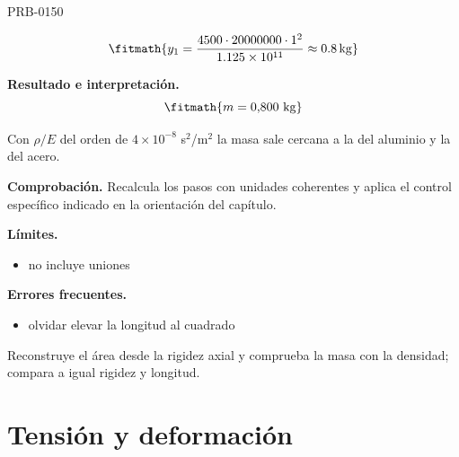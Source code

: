 \begin{studiumworked}{PRB-0150}
\begin{enumerate}
\[\fitmath{y_{1}=\frac{4500\cdot 20000000\cdot {1}^{2}}{1.125\times10^{11}}\approx 0.8\,\mathrm{kg}}\]

\end{enumerate}

\textbf{Resultado e interpretación.}\[\fitmath{m = 0{,}800\ \mathrm{kg}}\]

Con $\rho/E$ del orden de $4\times 10^{-8}$ s$^2$/m$^2$ la masa sale cercana a la del aluminio y la del acero.

\par\textbf{Comprobación.} Recalcula los pasos con unidades coherentes y aplica el control específico indicado en la orientación del capítulo.

\par\noindent\begin{minipage}{\linewidth}

\textbf{Límites.}\begin{itemize}\item no incluye uniones\end{itemize}

\textbf{Errores frecuentes.}\begin{itemize}\item olvidar elevar la longitud al cuadrado\end{itemize}

\begin{tcolorbox}[studiumcheck,breakable=false,title={Síntesis y comprobación}]Reconstruye el área desde la rigidez axial y comprueba la masa con la densidad; compara a igual rigidez y longitud.\end{tcolorbox}

\end{minipage}

\end{studiumworked}

\chapter{Tensión y deformación}


\Needspace{.3\textheight}

